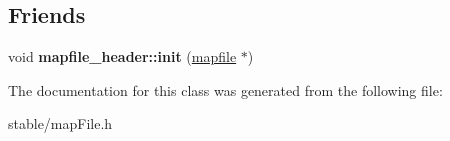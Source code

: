 \subsection*{Friends}
\begin{DoxyCompactItemize}
\item 
\hypertarget{classmapfile_ad2eb7d334ab9e7de861b764f3ddb3e09}{void {\bfseries mapfile\-\_\-header\-::init} (\hyperlink{classmapfile}{mapfile} $\ast$)}\label{classmapfile_ad2eb7d334ab9e7de861b764f3ddb3e09}

\end{DoxyCompactItemize}


The documentation for this class was generated from the following file\-:\begin{DoxyCompactItemize}
\item 
stable/map\-File.\-h\end{DoxyCompactItemize}
